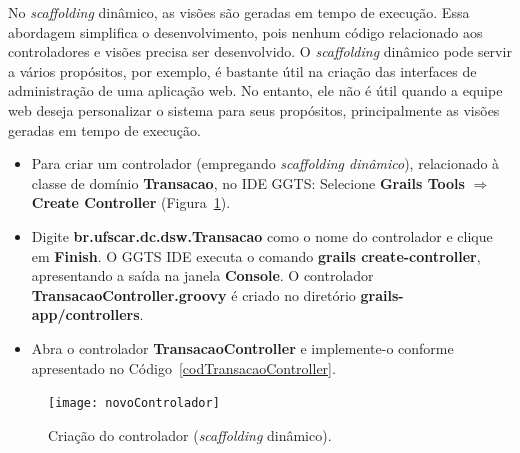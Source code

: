 \vspace{0.3cm}

No {\it scaffolding} dinâmico, as visões são geradas em tempo de execução.  Essa
abordagem  simplifica  o desenvolvimento,  pois  nenhum  código relacionado  aos
controladores e  visões precisa ser desenvolvido.  O  {\it scaffolding} dinâmico
pode servir  a vários propósitos,  por exemplo, é  bastante útil na  criação das
interfaces de  administração de uma  aplicação web. No  entanto, ele não  é útil
quando  a  equipe  web  deseja  personalizar o  sistema  para  seus  propósitos,
principalmente as visões geradas em tempo de execução. 

\vspace{0.3cm}

\begin{itemize}

\item  Para  criar  um  controlador  (empregando  {\it  scaffolding  dinâmico}),
  relacionado à classe  de domínio {\bf Transacao}, no  IDE GGTS: Selecione {\bf
    Grails     Tools}      $\Longrightarrow$     {\bf     Create     Controller}
  (Figura~\ref{novoControladorFig}).  

\vspace{0.3cm}

\item Digite {\bf br.ufscar.dc.dsw.Transacao} como o nome do controlador e clique
  em   {\bf   Finish}.   O   GGTS    IDE   executa   o   comando   {\bf   grails
    create-controller},  apresentando  a  saída  na  janela  {\bf  Console}.   O
  controlador  {\bf  TransacaoController.groovy}  é  criado  no  diretório  {\bf
    grails-app/controllers}. 

\vspace{0.3cm}

\item  Abra  o controlador  {\bf  TransacaoController}  e implemente-o  conforme
  apresentado no Código~\ref{codTransacaoController}.

\end{itemize}

\vspace{0.5cm}

\begin{figure}[htbp]
\centering\texttt{[image: novoControlador]}
\caption{Criação do controlador ({\it scaffolding} dinâmico).}
\label{novoControladorFig}
\end{figure}

